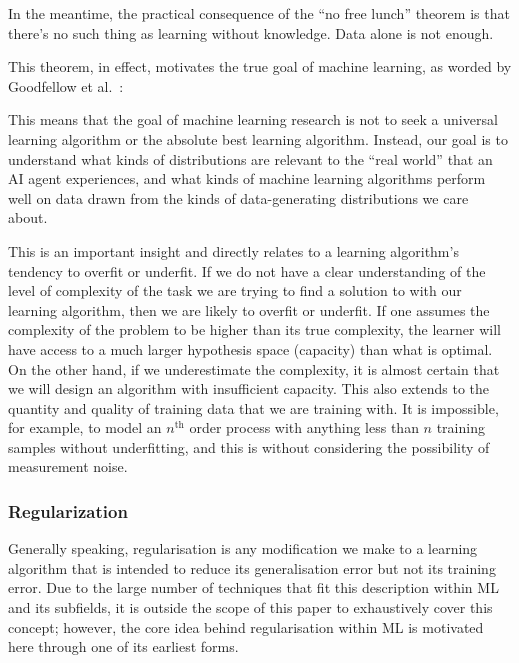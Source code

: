 \begin{fancyquotes}
    In the meantime, the practical consequence of the “no free lunch” theorem is that there’s no such thing as learning without knowledge. Data alone is not enough.
\end{fancyquotes}

This theorem, in effect, motivates the true goal of machine learning, as worded
by Goodfellow et al.~\cite[p.~116]{Goodfellow-et-al-2016}:

\begin{fancyquotes}
    This means that the goal of machine learning research is not to seek
    a universal learning algorithm or the absolute best learning algorithm.
    Instead, our goal is to understand what kinds of distributions are relevant
    to the “real world” that an AI agent experiences, and what kinds of machine
    learning algorithms perform well on data drawn from the kinds of
    data-generating distributions we care about.
\end{fancyquotes}


This is an important insight and directly relates to a learning algorithm's
tendency to overfit or underfit. If we do not have a clear understanding of the
level of complexity of the task we are trying to find a solution to with our
learning algorithm, then we are likely to overfit or underfit. If one assumes
the complexity of the problem to be higher than its true complexity, the learner
will have access to a much larger hypothesis space (capacity) than what is
optimal. On the other hand, if we underestimate the complexity, it is almost
certain that we will design an algorithm with insufficient capacity. This also
extends to the quantity and quality of training data that we are training with.
It is impossible, for example, to model an $n^\text{th}$ order process with anything less
than $n$ training samples without underfitting, and this is without considering
the possibility of measurement noise.

\subsubsection{Regularization}
Generally speaking, regularisation is any modification we make to a learning algorithm that is intended to reduce its generalisation error but not its training error. Due to the large number of techniques that fit this description within \gls{ML} and its subfields, it is outside the scope of this paper to exhaustively cover this concept; however, the core idea behind regularisation within \gls{ML} is motivated here through one of its earliest forms.

